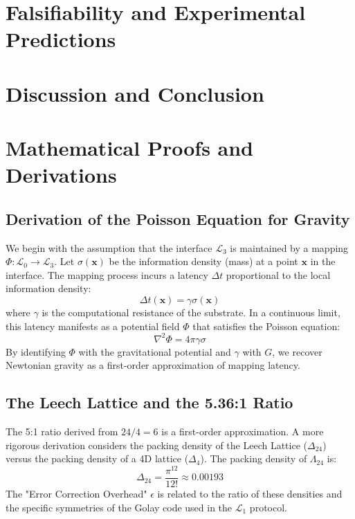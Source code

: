 \documentclass[11pt,onecolumn]{article}
\newcommand{\substrate}{\mathcal{L}_0}
\newcommand{\protocol}{\mathcal{L}_1}
\newcommand{\interface}{\mathcal{L}_3}
\newcommand{\leech}{\Lambda_{24}}
\begin{document}
\section{Falsifiability and Experimental Predictions}

\section{Discussion and Conclusion}

\appendix
\section{Mathematical Proofs and Derivations}

\subsection{Derivation of the Poisson Equation for Gravity}
We begin with the assumption that the interface $\interface$ is maintained by a mapping $\Phi: \substrate \to \interface$. Let $\sigma(\mathbf{x})$ be the information density (mass) at a point $\mathbf{x}$ in the interface. The mapping process incurs a latency $\Delta t$ proportional to the local information density:
\begin{equation}
\Delta t(\mathbf{x}) = \gamma \sigma(\mathbf{x})
\end{equation}
where $\gamma$ is the computational resistance of the substrate. In a continuous limit, this latency manifests as a potential field $\Phi$ that satisfies the Poisson equation:
\begin{equation}
\nabla^2 \Phi = 4\pi \gamma \sigma
\end{equation}
By identifying $\Phi$ with the gravitational potential and $\gamma$ with $G$, we recover Newtonian gravity as a first-order approximation of mapping latency.

\subsection{The Leech Lattice and the 5.36:1 Ratio}
The 5:1 ratio derived from $24/4=6$ is a first-order approximation. A more rigorous derivation considers the packing density of the Leech Lattice ($\Delta_{24}$) versus the packing density of a 4D lattice ($\Delta_4$).
The packing density of $\leech$ is:
\begin{equation}
\Delta_{24} = \frac{\pi^{12}}{12!} \approx 0.00193
\end{equation}
The "Error Correction Overhead" $\epsilon$ is related to the ratio of these densities and the specific symmetries of the Golay code used in the $\protocol$ protocol.
\end{document}
